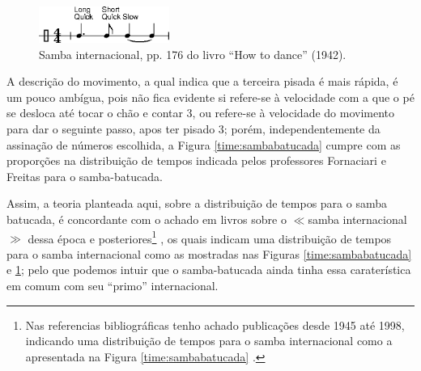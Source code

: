 \begin{itemize}
\parbox[t]{\dimexpr\textwidth-\leftmargin}{%
\begin{figure}
  \vspace{-10pt}
  \includegraphics[width=0.38\textwidth]{chapters/cap-historia-sambagafieira/samba-internacional-timming.eps}
  \caption{Samba internacional, pp. 176 do livro ``How to dance'' (1942).}
  \vspace{-10pt}
  \label{timming:samba-internacional:a}
\end{figure}
A descrição do movimento, a qual indica que a terceira pisada é mais rápida,
é um pouco ambígua, 
pois não fica evidente si refere-se à velocidade com a que o pé se desloca até tocar o chão e contar 3,
ou refere-se à velocidade do movimento para dar o seguinte passo, apos ter pisado 3;
porém, 
independentemente da assinação de números escolhida, 
a Figura \ref{time:sambabatucada} cumpre com as proporções na distribuição de tempos 
indicada pelos professores Fornaciari e Freitas para o samba-batucada.
}
Assim, a teoria planteada aqui, sobre a distribuição de tempos para o samba batucada, 
é concordante com o achado em livros sobre o $\ll$samba internacional$\gg$  
dessa época e posteriores\footnote{Nas referencias bibliográficas tenho achado publicações desde 1945 até 1998,
indicando uma distribuição de tempos para o samba internacional como a apresentada na Figura \ref{time:sambabatucada}
\cite[pp. 7,176]{wright1945dance} \cite[pp. 193]{white1953dancing} \cite[pp. 69]{stephenson1992complete} \cite[pp. 125]{harris1998social}.}
\cite[pp. 7,176]{wright1945dance} \cite[pp. 193]{white1953dancing} \cite[pp. 69]{stephenson1992complete} \cite[pp. 125]{harris1998social},
os quais indicam uma distribuição de tempos para o samba internacional como as mostradas nas Figuras \ref{time:sambabatucada} e \ref{timming:samba-internacional:a};
pelo que podemos intuir que o samba-batucada ainda tinha essa caraterística em comum com seu ``primo'' internacional.

\end{itemize}
